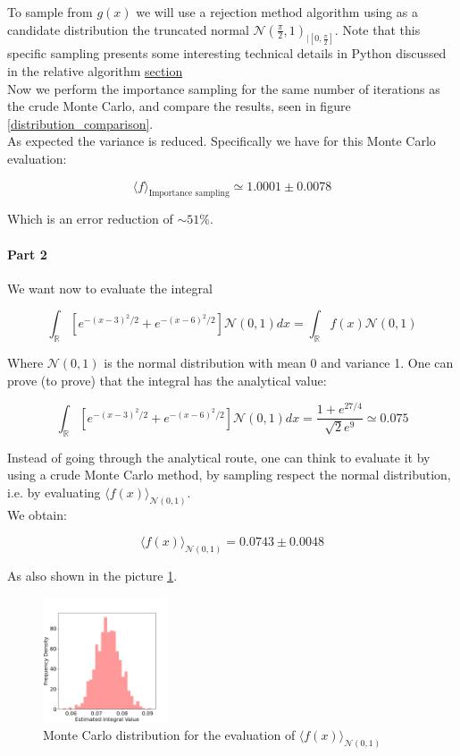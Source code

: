 To sample from $g(x)$ we will use a rejection method algorithm using as a candidate distribution the truncated normal $\mathcal{N}(\frac{\pi}{2}, 1)_{\mid [0, \frac{\pi}{2}]}$. 
Note that this specific sampling presents some interesting technical details in Python discussed in the relative algorithm \hyperref[par:detail_rejection]{section} \\
Now we perform the importance sampling for the same number of iterations as the crude Monte Carlo, and compare the results, seen in figure \ref{distribution_comparison}. \\
As expected the variance is reduced. Specifically we have for this Monte Carlo evaluation:

$$ \langle f \rangle_{\text{Importance sampling}} \simeq 1.0001 \pm 0.0078 $$

Which is an error reduction of $\sim 51 \%$.

\paragraph*{Part 2} We want now to evaluate the integral


$$\int_{\mathbb{R}}\left[ e^{-(x-3)^2/2}+e^{-(x-6)^2/2} \right] \mathcal{N}(0,1) dx = \int_{\mathbb{R}} f(x) \mathcal{N}(0,1) $$

Where $\mathcal{N}(0,1)$ is the normal distribution with mean 0 and variance 1.
One can prove (to prove) that the integral has the analytical value:

$$ \int_{\mathbb{R}}\left[ e^{-(x-3)^2/2}+e^{-(x-6)^2/2} \right] \mathcal{N}(0,1) dx = \frac{1 + e^{27/4}}{\sqrt{2} e^9} \simeq 0.075 $$

Instead of going through the analytical route, one can think to evaluate it by using a crude Monte Carlo method, by sampling respect the normal distribution, 
i.e. by evaluating $\langle f(x) \rangle_{\mathcal{N}(0,1)}$. \\
We obtain:

$$ \langle f(x) \rangle_{\mathcal{N}(0,1)} = 0.0743 \pm 0.0048 $$

As also shown in the picture \ref{crude_mc_integral2}.

\begin{figure}
  \vspace{-25pt}
  \centering
  \includegraphics[width=0.33\textwidth]{FIG/exercise_3_images/distribution_crude_mc_ex2.png}
\caption{Monte Carlo distribution for the evaluation of $\langle f(x) \rangle_{\mathcal{N}(0,1)}$}
\label{crude_mc_integral2}
\end{figure}

